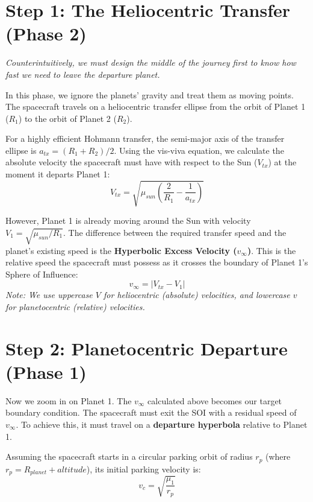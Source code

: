 \documentclass[12pt]{article}
\begin{document}
\section*{Step 1: The Heliocentric Transfer (Phase 2)}
\textit{Counterintuitively, we must design the middle of the journey first to know how fast we need to leave the departure planet.}

In this phase, we ignore the planets' gravity and treat them as moving points. The spacecraft travels on a heliocentric transfer ellipse from the orbit of Planet 1 ($R_1$) to the orbit of Planet 2 ($R_2$). 

For a highly efficient Hohmann transfer, the semi-major axis of the transfer ellipse is $a_{tx} = (R_1 + R_2)/2$. Using the vis-viva equation, we calculate the absolute velocity the spacecraft must have with respect to the Sun ($V_{tx}$) at the moment it departs Planet 1:
\begin{equation}
    V_{tx} = \sqrt{\mu_{sun} \left( \frac{2}{R_1} - \frac{1}{a_{tx}} \right)}
\end{equation}

However, Planet 1 is already moving around the Sun with velocity $V_1 = \sqrt{\mu_{sun}/R_1}$. The difference between the required transfer speed and the planet's existing speed is the \textbf{Hyperbolic Excess Velocity ($v_\infty$)}. This is the relative speed the spacecraft must possess as it crosses the boundary of Planet 1's Sphere of Influence:
\begin{equation}
    v_{\infty} = | V_{tx} - V_1 |
\end{equation}
\textit{Note: We use uppercase $V$ for heliocentric (absolute) velocities, and lowercase $v$ for planetocentric (relative) velocities.}


\section*{Step 2: Planetocentric Departure (Phase 1)}
Now we zoom in on Planet 1. The $v_\infty$ calculated above becomes our target boundary condition. The spacecraft must exit the SOI with a residual speed of $v_\infty$. To achieve this, it must travel on a \textbf{departure hyperbola} relative to Planet 1.

Assuming the spacecraft starts in a circular parking orbit of radius $r_p$ (where $r_p = R_{planet} + altitude$), its initial parking velocity is:
\begin{equation}
    v_c = \sqrt{\frac{\mu_1}{r_p}}
\end{equation}
\end{document}
